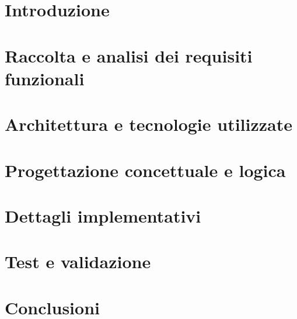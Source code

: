 \frontmatter
\maketitle
\dedication{
  Placeholder
}

\tableofcontents

\mainmatter

\chapter{Introduzione}


\chapter{Raccolta e analisi dei requisiti funzionali}


\chapter{Architettura e tecnologie utilizzate}


\chapter{Progettazione concettuale e logica}


\chapter{Dettagli implementativi}

\chapter{Test e validazione}

\chapter{Conclusioni}

\backmatter
